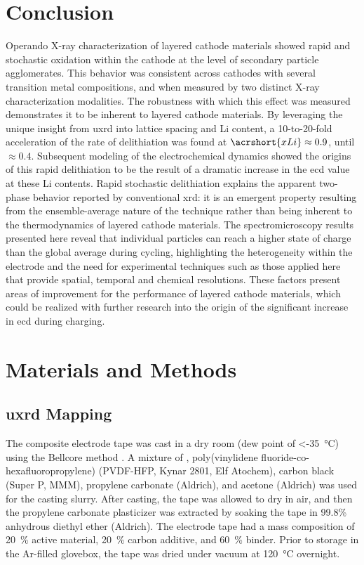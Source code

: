 \documentclass{article}
\begin{document}
\section{Conclusion}

Operando X-ray characterization of layered cathode materials showed
rapid and stochastic oxidation within the cathode at the level of
secondary particle agglomerates. This behavior was consistent across
cathodes with several transition metal compositions, and when measured
by two distinct X-ray characterization modalities. The robustness with
which this effect was measured demonstrates it to be inherent to
layered cathode materials. By leveraging the unique insight from
\gls{uxrd} into lattice spacing and Li content, a 10-to-20-fold
acceleration of the rate of delithiation was found at $\acrshort{xLi}
\approx 0.9$, until $\approx 0.4$. Subsequent modeling of the
electrochemical dynamics showed the origins of this rapid delithiation
to be the result of a dramatic increase in the \gls{ecd} value at
these Li contents. Rapid stochastic delithiation explains the apparent
two-phase behavior reported by conventional \gls{xrd}: it is an
emergent property resulting from the ensemble-average nature of the
technique rather than being inherent to the thermodynamics of layered
cathode materials. The spectromicroscopy results presented here reveal
that individual particles can reach a higher state of charge than the
global average during cycling, highlighting the heterogeneity within
the electrode and the need for experimental techniques such as those
applied here that provide spatial, temporal and chemical
resolutions. These factors present areas of improvement for the
performance of layered cathode materials, which could be realized with
further research into the origin of the significant increase in
\gls{ecd} during charging.

\section*{Materials and Methods}
\label{sec:methods}

\subsection*{\gls{uxrd} Mapping}

The \nca{} composite electrode tape was cast in a dry room (dew point
of \SI{<-35}{\celsius}) using the Bellcore method \cite{warren1996}. A
mixture of \nca{}, poly(vinylidene fluoride-co-hexafluoropropylene)
(PVDF-HFP, Kynar 2801, Elf Atochem), carbon black (Super P, MMM),
propylene carbonate (Aldrich), and acetone (Aldrich) was used for the
casting slurry. After casting, the tape was allowed to dry in air, and
then the propylene carbonate plasticizer was extracted by soaking the
tape in 99.8\% anhydrous diethyl ether (Aldrich). The electrode tape
had a mass composition of \SI{20}{\percent} active material,
\SI{20}{\percent} carbon additive, and \SI{60}{\percent} binder. Prior
to storage in the Ar-filled glovebox, the tape was dried under vacuum
at \SI{120}{\celsius} overnight.
\end{document}

